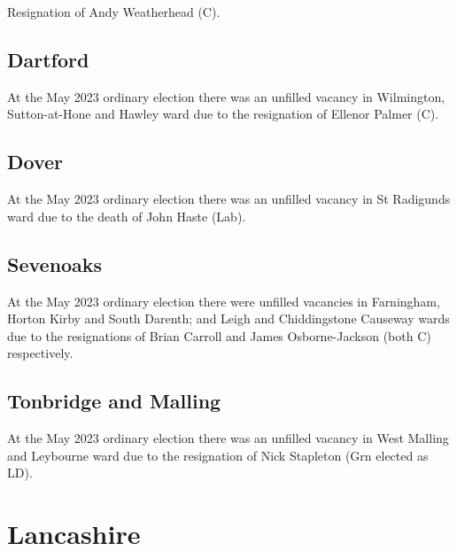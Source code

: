\documentclass[a4paper,openany]{book}
\begin{document}
\begin{resultsiii}

Resignation of Andy Weatherhead (C).

\subsection*{Dartford}

At the May 2023 ordinary election there was an unfilled vacancy in Wilmington, Sutton-at-Hone and Hawley ward due to the resignation of Ellenor Palmer (C).%

\subsection*{Dover}

At the May 2023 ordinary election there was an unfilled vacancy in St Radigunds ward due to the death of John Haste (Lab).%

\subsection*{Sevenoaks}

At the May 2023 ordinary election there were unfilled vacancies in Farningham, Horton Kirby and South Darenth; and Leigh and Chiddingstone Causeway wards due to the resignations of Brian Carroll and James Osborne-Jackson (both C) respectively.%
%

\subsection*{Tonbridge and Malling}

At the May 2023 ordinary election there was an unfilled vacancy in West Malling and Leybourne ward due to the resignation of Nick Stapleton (Grn elected as LD).%

\section{Lancashire}


\end{resultsiii}
\end{document}
